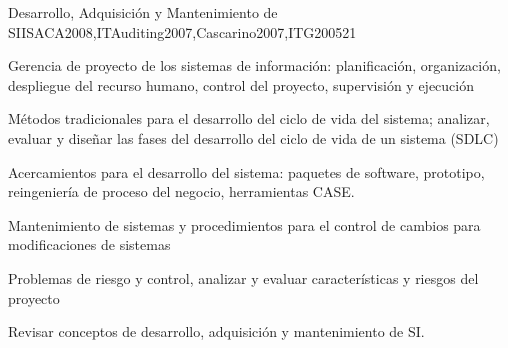 \begin{syllabus}
\begin{unit}{Desarrollo, Adquisición y Mantenimiento de SI}{ISACA2008,ITAuditing2007,Cascarino2007,ITG2005}{2}{1}
\begin{topics}
\item Gerencia de proyecto de los sistemas de información: planificación, organización, despliegue del recurso humano, control del proyecto, supervisión y ejecución
\item Métodos tradicionales para el desarrollo del ciclo de vida del sistema; analizar, evaluar y diseñar las fases del desarrollo del ciclo de vida de un sistema (SDLC)
\item Acercamientos para el desarrollo del sistema: paquetes de software, prototipo, reingeniería de proceso del negocio, herramientas CASE.
\item Mantenimiento de sistemas y procedimientos para el control de cambios para modificaciones de sistemas
\item Problemas de riesgo y control, analizar y evaluar características y riesgos del proyecto
\end{topics}
\begin{learningoutcomes}
\item Revisar conceptos de desarrollo, adquisición y mantenimiento de SI.
\end{learningoutcomes}
\end{unit}


\end{syllabus}
